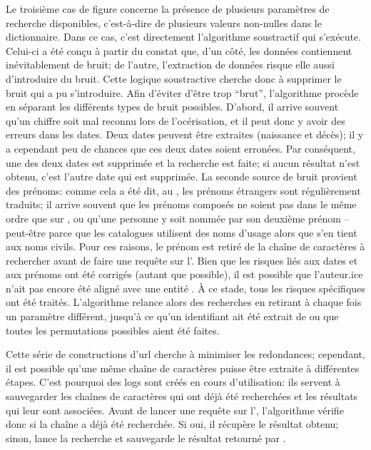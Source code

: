 Le troisième cas de figure concerne la présence de plusieurs paramètres de recherche disponibles, c'est-à-dire de plusieurs valeurs non-nulles dans le \gls{dictionnaire}. Dans ce cas, c'est directement l'algorithme soustractif qui s'exécute. Celui-ci a été conçu à partir du constat que, d'un côté, les données contiennent inévitablement de bruit; de l'autre, l'extraction de données risque elle aussi d'introduire du bruit. Cette logique soustractive cherche donc à supprimer le bruit qui a pu s'introduire. Afin d'éviter d'être trop \enquote{brut}, l'algorithme procède en séparant les différents types de bruit possibles. D'abord, il arrive souvent qu'un chiffre soit mal reconnu lors de l'océrisation, et il peut donc y avoir des erreurs dans les dates. Deux dates peuvent être extraites (naissance et décès); il y a cependant peu de chances que ces deux dates soient erronées. Par conséquent, une des deux dates est supprimée et la recherche est faite; si aucun résultat n'est obtenu, c'est l'autre date qui est supprimée. La seconde source de bruit provient des prénoms: comme cela a été dit, au , les prénoms étrangers sont régulièrement traduits; il arrive souvent que les prénoms composés ne soient pas dans le même ordre que sur \wkd{}, ou qu'une personne y soit nommée par son deuxième prénom -- peut-être parce que les catalogues utilisent des noms d'usage alors que \wkd{} s'en tient aux noms civils. Pour ces raisons, le prénom est retiré de la chaîne de caractères à rechercher avant de faire une requête sur l'\api{}. Bien que les risques liés aux dates et aux prénoms ont été corrigés (autant que possible), il est possible que l'auteur.ice n'ait pas encore été aligné avec une entité \wkd{}. À ce stade, tous les risques spécifiques ont été traités. L'algorithme relance alors des recherches en retirant à chaque fois un paramètre différent, jusqu'à ce qu'un identifiant ait été extrait de \wkd{} ou que toutes les permutations possibles aient été faites.

Cette série de constructions d'\gls{url} cherche à minimiser les redondances; cependant, il est possible qu'une même chaîne de caractères puisse être extraite à différentes étapes. C'est pourquoi des \glspl{log} sont créés en cours d'utilisation: ils servent à sauvegarder les chaînes de caractères qui ont déjà été recherchées et les résultats qui leur sont associées. Avant de lancer une requête sur l'\api{}, l'algorithme vérifie donc si la chaîne a déjà été recherchée. Si oui, il récupère le résultat obtenu; sinon, lance la recherche et sauvegarde le résultat retourné par \wkd{}.

